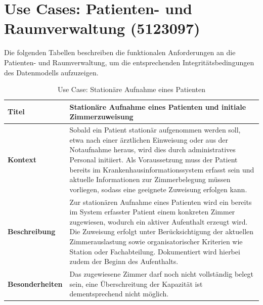 \section{Use Cases: Patienten- und Raumverwaltung (5123097)}

Die folgenden Tabellen beschreiben die funktionalen Anforderungen an die Patienten- und Raumverwaltung, um die entsprechenden Integritätsbedingungen des Datenmodells aufzuzeigen.

\begin{table}[H]
\centering
\renewcommand{\arraystretch}{1.4}
\begin{tabularx}{\textwidth}{|p{4cm}|X|}
\hline
\textbf{Titel} & \textbf{Stationäre Aufnahme eines Patienten und initiale Zimmerzuweisung} \\ \hline

\textbf{Kontext} & 
Sobald ein Patient stationär aufgenommen werden soll, etwa nach einer ärztlichen Einweisung oder aus der Notaufnahme heraus, wird dies durch administratives Personal initiiert.
Als Voraussetzung muss der Patient bereits im Krankenhausinformationssystem erfasst sein und aktuelle Informationen zur Zimmerbelegung müssen vorliegen, sodass eine geeignete Zuweisung erfolgen kann. \\ \hline

\textbf{Beschreibung} & 
Zur stationären Aufnahme eines Patienten wird ein bereits im System erfasster Patient einem konkreten Zimmer zugewiesen, wodurch ein aktiver Aufenthalt erzeugt wird. 
Die Zuweisung erfolgt unter Berücksichtigung der aktuellen Zimmerauslastung sowie organisatorischer Kriterien wie Station oder Fachabteilung. 
Dokumentiert wird hierbei zudem der Beginn des Aufenthalts. \\ \hline

\textbf{Besonderheiten} &
Das zugewiesene Zimmer darf noch nicht vollständig belegt sein, eine Überschreitung der Kapazität ist dementsprechend nicht möglich.\\ \hline

\end{tabularx}
\caption{Use Case: Stationäre Aufnahme eines Patienten}
\end{table}

